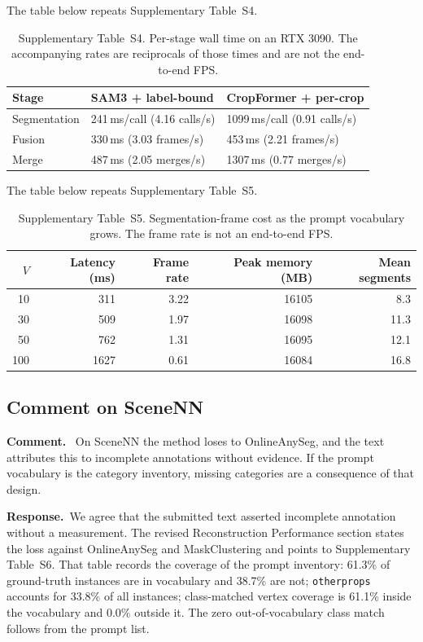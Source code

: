 \documentclass[11pt]{article}
\newcommand{\revcomment}[1]{%
  \par\vspace{0.6em}\noindent\textcolor{revblue}{\textbf{Comment.}}\ %
  \textcolor{revblue}{#1}\par\vspace{0.4em}}
\newcommand{\revresponse}[1]{%
  \par\noindent\textbf{Response.}\ #1\par\vspace{0.3em}}
\begin{document}
\noindent The table below repeats Supplementary Table~S4.

\begin{table}[ht]
\centering
\caption{Supplementary Table~S4. Per-stage wall time on an RTX 3090. The accompanying rates are reciprocals of those times and are not the end-to-end FPS.}
\label{tab:stages}
\small
\begin{tabular}{lll}
\toprule
Stage & SAM3 + label-bound & CropFormer + per-crop \\
\midrule
Segmentation & 241\,ms/call (4.16 calls/s) & 1099\,ms/call (0.91 calls/s) \\
Fusion & 330\,ms (3.03 frames/s) & 453\,ms (2.21 frames/s) \\
Merge & 487\,ms (2.05 merges/s) & 1307\,ms (0.77 merges/s) \\
\bottomrule
\end{tabular}
\end{table}

\noindent The table below repeats Supplementary Table~S5.

\begin{table}[ht]
\centering
\caption{Supplementary Table~S5. Segmentation-frame cost as the prompt vocabulary grows. The frame rate is not an end-to-end FPS.}
\label{tab:vocab}
\small
\begin{tabular}{rrrrr}
\toprule
\(V\) & Latency (ms) & Frame rate & Peak memory (MB) & Mean segments \\
\midrule
10 & 311 & 3.22 & 16105 & 8.3 \\
30 & 509 & 1.97 & 16098 & 11.3 \\
50 & 762 & 1.31 & 16095 & 12.1 \\
100 & 1627 & 0.61 & 16084 & 16.8 \\
\bottomrule
\end{tabular}
\end{table}

\subsection*{Comment on SceneNN}

\revcomment{On SceneNN the method loses to OnlineAnySeg, and the text attributes this to incomplete annotations without evidence. If the prompt vocabulary is the category inventory, missing categories are a consequence of that design.}

\revresponse{We agree that the submitted text asserted incomplete annotation without a measurement. The revised Reconstruction Performance section states the loss against OnlineAnySeg and MaskClustering and points to Supplementary Table~S6. That table records the coverage of the prompt inventory: 61.3\% of ground-truth instances are in vocabulary and 38.7\% are not; \texttt{otherprops} accounts for 33.8\% of all instances; class-matched vertex coverage is 61.1\% inside the vocabulary and 0.0\% outside it. The zero out-of-vocabulary class match follows from the prompt list.}
\end{document}
